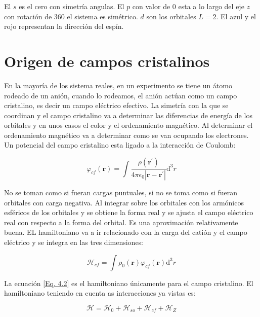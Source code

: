 \documentclass[11pt,fleqn]{book}
\begin{document}

El $s$ es el cero con simetría angulas. El $p$ con valor de $0$ esta a lo largo del eje $z$  con rotación de $360$ el sistema es simétrico. $d$ son los orbitales $L=2$. El azul y el rojo representan la dirección del espín. 

\section{Origen de campos cristalinos}
    
En la mayoría de los sistema reales, en un experimento se tiene un átomo rodeado de un anión, cuando lo rodeamos, el anión actúan como un campo cristalino, es decir un campo eléctrico efectivo. La simetría con la que se coordinan y el campo cristalino va a determinar las diferencias de energía de los orbitales y en unos casos el color y el ordenamiento magnético. Al determinar el ordenamiento magnético va a determinar como se van ocupando los electrones. Un potencial del campo cristalino esta ligado a la interacción de Coulomb:

\begin{equation}
\varphi_{c f}(\boldsymbol{r})=\int \frac{\rho\left(\mathbf{r}^{\prime}\right)}{4 \pi \epsilon_{0}\left|\boldsymbol{r}-\boldsymbol{r}^{\prime}\right|}\mathrm{d}^{3} r
\label{Eq. 4.1}
\end{equation}

No se toman como si fueran cargas puntuales, si no se toma como si fueran orbitales con carga negativa. Al integrar sobre los orbitales con los armónicos esféricos de los orbitales y se obtiene la forma real y se ajusta el campo eléctrico real con respecto a la forma del orbital. Es una aproximación relativamente buena. EL hamiltoniano va a ir relacionado con la carga del catión y el campo eléctrico y se integra en las tres dimensiones:

\begin{equation}
\mathcal{H}_{c f}=\int \rho_{0}(\boldsymbol{r}) \varphi_{c f}(\boldsymbol{r}) \mathrm{d}^{3} r
\label{Eq. 4.2}
\end{equation}

La ecuación \ref{Eq. 4.2} es el hamiltoniano únicamente para el campo cristalino. El hamiltoniano teniendo en cuenta as interacciones ya vistas es:

\begin{equation}
\mathcal{H}=\mathcal{H}_{0}+\mathcal{H}_{s o}+\mathcal{H}_{c f}+\mathcal{H}_{Z}
\label{Eq. 4.3}
\end{equation}
\end{document}
